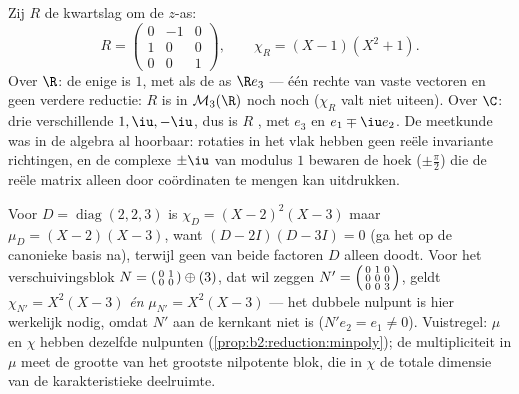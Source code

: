 \begin{example}\label{ex:b2:reduction:rotation3d}
Zij $R$ de kwartslag om de $z$-as:
\[
R = \begin{pmatrix}
0 & -1 & 0\\
1 & 0 & 0\\
0 & 0 & 1
\end{pmatrix},
\qquad
\chi_R = (X - 1)(X^2 + 1).
\]
Over $\R$: de enige  is $1$, met als  de as
$\R e_3$ --- één rechte van vaste vectoren en geen verdere
reductie: $R$ is in $\mathcal{M}_3(\R)$ noch  noch
 ($\chi_R$ valt niet uiteen). Over $\C$: drie
verschillende  $1, \iu, -\iu$, dus is $R$
, met  $e_3$ en $e_1 \mp \iu e_2$. De
meetkunde was in de algebra al hoorbaar: rotaties in het vlak
hebben geen reële invariante richtingen, en de complexe
 $\pm\iu$ van modulus $1$ bewaren de hoek
($\pm\frac\pi2$) die de reële matrix alleen door coördinaten te
mengen kan uitdrukken.
\end{example}

\begin{example}\label{ex:b2:reduction:minvschar}
Voor $D = \operatorname{diag}(2, 2, 3)$ is $\chi_D = (X - 2)^2(X -
3)$ maar $\mu_D = (X - 2)(X - 3)$, want $(D - 2I)(D - 3I) = 0$ (ga
het op de canonieke basis na), terwijl geen van beide factoren $D$
alleen doodt. Voor het verschuivingsblok $N =
\begin{psmallmatrix}0 & 1\\ 0 & 0\end{psmallmatrix} \oplus (3)$,
dat wil zeggen $N' = \begin{psmallmatrix}0 & 1 & 0\\ 0 & 0 & 0\\ 0
& 0 & 3\end{psmallmatrix}$, geldt $\chi_{N'} = X^2(X - 3)$
\emph{én} $\mu_{N'} = X^2(X - 3)$ --- het dubbele nulpunt is hier
werkelijk nodig, omdat $N'$ aan de kernkant niet 
is ($N'e_2 = e_1 \neq 0$). Vuistregel: $\mu$ en $\chi$ hebben
dezelfde nulpunten (\cref{prop:b2:reduction:minpoly}); de
multipliciteit in $\mu$ meet de grootte van het grootste
nilpotente blok, die in $\chi$ de totale dimensie van de
karakteristieke deelruimte.
\end{example}

